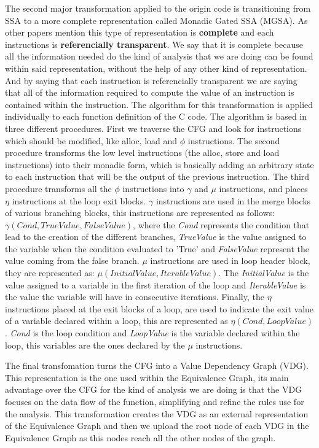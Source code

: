 \documentclass{article}
\begin{document}
The second major transformation applied to the origin code is transitioning from SSA to a more complete representation called Monadic Gated SSA (MGSA).
As other papers mention this type of representation is \textbf{complete} and each instructions is \textbf{referencially transparent}.
We say that it is complete because all the information needed do the kind of analysis that we are doing can be found within said representation,
without the help of any other kind of representation. And by saying that each instruction is referencially transparent we are saying that
all of the information required to compute the value of an instruction is contained within the instruction.
The algorithm for this transformation is applied individually to each function definition of the C code. The algorithm is based in three different procedures.
First we traverse the CFG and look for instructions which should be modified, like alloc, load and $\phi$ instructions.
The second procedure transforms the low level instructions (the alloc, store and load instructions) into their monadic form, which is basically adding an arbitrary state
to each instruction that will be the output of the previous instruction.
The third procedure transforms all the $\phi$ instructions into $\gamma$ and $\mu$ instructions, and places $\eta$ instructions at the loop exit blocks.
$\gamma$ instructions are used in the merge blocks of various branching blocks, this instructions are represented as follows: $\gamma(Cond, TrueValue, FalseValue)$,
where the \textit{Cond} represents the condition that lead to the creation of the different branches, \textit{TrueValue} is the value assigned to the variable when the condition
evaluated to 'True' and \textit{FalseValue} represent the value coming from the false branch.
$\mu$ instructions are used in loop header block, they are represented as: $\mu(InitialValue, IterableValue)$. The \textit{InitialValue} is the value assigned to a variable
in the first iteration of the loop and \textit{IterableValue} is the value the variable will have in consecutive iterations.
Finally, the $\eta$ instructions placed at the exit blocks of a loop, are used to indicate the exit value of a variable declared within a loop, this are represented as $\eta(Cond, LoopValue)$.
\textit{Cond} is the loop condition and \textit{LoopValue} is the variable declared within the loop, this variables are the ones declared by the $\mu$ instructions.

The final transfomation turns the CFG into a Value Dependency Graph (VDG). This representation is the one used within the Equivalence Graph, its main advantage
over the CFG for the kind of analysis we are doing is that the VDG focuses on the data flow of the function, simplifying and refine the rules use for the analysis.
This transformation creates the VDG as an external representation of the Equivalence Graph and then we upload the root node of each VDG in the Equivalence Graph as this
nodes reach all the other nodes of the graph.
\end{document}
